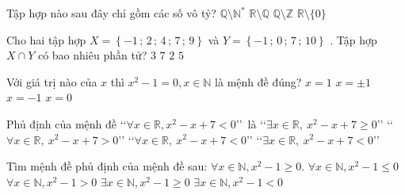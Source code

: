 \begin{ex}%
Tập hợp nào sau đây chỉ gồm các số vô tỷ?
\choice
{$\mathbb{Q} \setminus \mathbb{N}^*$}
{\True $\mathbb{R} \setminus \mathbb{Q}$}
{$\mathbb{Q} \setminus \mathbb{Z}$}
{$\mathbb{R} \setminus \big\{0\big\}$}
\end{ex}

\begin{ex} %
Cho hai tập hợp $X = \left\{ { - 1\,;\,2\,;\,4\,;\,7\,;\,9} \right\}$  và $Y = \left\{ { - 1\,;\,0\,;\,7\,;\,10} \right\}$  . Tập hợp $X \cap Y$  có bao
nhiêu phần tử?
\choice
{ $ 3 $ }
{ $ 7 $ }
{\True $ 2 $ }
{ $ 5 $ }
\end{ex}

\begin{ex}%
Với giá trị nào của  $x$ thì $x^2-1=0, x \in \mathbb{N}$    là mệnh đề đúng?
\choice
{\True $x=1$ }
{$x=\pm 1$ }
{ $x=-1$}
{ $x=0$}
\end{ex}

\begin{ex}%
Phủ định của mệnh đề \lq \lq$\forall x\in \mathbb{R},{{x}^{2}}-x+7<0$\rq\rq \ là
\choice
{\True \lq \lq $\exists x\in \mathbb{R}, \ x^2-x+7\ge 0$\rq\rq }
{\lq \lq$\forall x\in \mathbb{R},\ x^2-x+7>0$\rq\rq }
{\lq \lq$\forall x\in \mathbb{R},\ x^2-x+7<0$\rq\rq }
{\lq \lq$ \exists x\in \mathbb{R},\ x^2-x+7<0$\rq\rq }
\end{ex}

\begin{ex}%
Tìm mệnh đề phủ định của mệnh đề sau:  $ \forall x\in\mathbb{N}, x^2-1\geq 0 $.
\choice
{$ \forall x\in\mathbb{N}, x^2-1\leq 0 $}
{$ \forall x\in\mathbb{N}, x^2-1>0 $}
{$ \exists x\in\mathbb{N}, x^2-1\geq 0 $}
{\True $ \exists x\in\mathbb{N}, x^2-1<0 $}
\end{ex}

